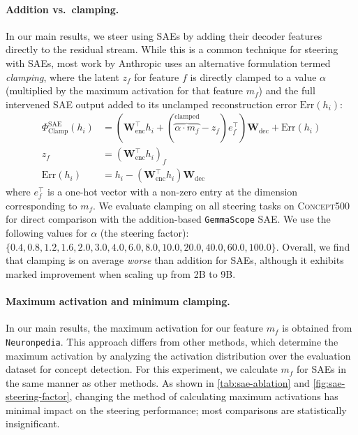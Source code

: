 \documentclass{article}
\theoremstyle{plain}
\theoremstyle{definition}
\theoremstyle{remark}
\renewcommand{\cite}{\citep}
\begin{document}
\paragraph{Addition vs.~clamping.}
In our main results, we steer using SAEs by adding their decoder features directly to the residual stream. While this is a common technique for steering with SAEs, most work by Anthropic \cite[e.g.][]{templeton2024scaling,durmus2024steering} uses an alternative formulation termed \textit{clamping}, where the latent $z_f$ for feature $f$ is directly clamped to a value $\alpha$ (multiplied by the maximum activation for that feature $m_f$) and the full intervened SAE output added to its unclamped reconstruction error $\mathrm{Err}(h_i)$:
\begin{align}
\Phi^{\text{SAE}}_{\text{Clamp}}(h_i) &= (\mathbf{W}_{\mathrm{enc}}^{\top}h_i + (\overbrace{\alpha \cdot m_f}^{\text{clamped}} - z_f)e_f^{\top})\mathbf{W}_{\mathrm{dec}} + \mathrm{Err}(h_i)\\
z_f &= (\mathbf{W}_{\mathrm{enc}}^{\top}h_i)_f\\
\mathrm{Err}(h_i) &= h_i - (\mathbf{W}_{\mathrm{enc}}^{\top}h_i)\mathbf{W}_{\mathrm{dec}}
\end{align}
where \( e_f^{\top} \) is a one-hot vector with a non-zero entry at the dimension corresponding to \( m_f \). We evaluate clamping on all steering tasks on \textsc{Concept500} for direct comparison with the addition-based \texttt{GemmaScope} SAE. We use the following values for $\alpha$ (the steering factor): $\{0.4, 0.8, 1.2, 1.6, 2.0, 3.0, 4.0, 6.0, 8.0, 10.0, 20.0, 40.0, 60.0, 100.0\}$. Overall, we find that clamping is on average \textit{worse} than addition for SAEs, although it exhibits marked improvement when scaling up from 2B to 9B.

\paragraph{Maximum activation and minimum clamping.}
In our main results, the maximum activation for our feature \( m_f \) is obtained from \texttt{Neuronpedia}. This approach differs from other methods, which determine the maximum activation by analyzing the activation distribution over the evaluation dataset for concept detection. For this experiment, we calculate \( m_f \) for SAEs in the same manner as other methods. As shown in \cref{tab:sae-ablation} and \cref{fig:sae-steering-factor}, changing the method of calculating maximum activations has minimal impact on the steering performance; most comparisons are statistically insignificant.
\end{document}
